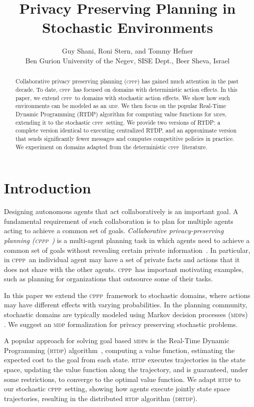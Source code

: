 \documentclass[letterpaper]{article} %
\title{Privacy Preserving Planning in Stochastic Environments}
\author{Guy Shani, Roni Stern, and Tommy Hefner\\
Ben Gurion University of the Negev, SISE Dept., Beer Sheva, Israel}
\newcommand{\cppp}{\textsc {cppp}\xspace}
\newcommand{\rtdp}{\textsc {rtdp}\xspace}
\newcommand{\drtdp}{\textsc {drtdp}\xspace}
\newcommand{\mdps}{\textsc {mdp}s\xspace}
\newcommand{\mdp}{\textsc {mdp}\xspace}
\theoremstyle{remark}
\newcommand{\citep}[1]{\cite{#1}}
\begin{document}
\maketitle

\begin{abstract}

Collaborative privacy preserving planning (\cppp) has gained much attention in the past decade. To date, \cppp\ has focused on domains with deterministic action effects. In this paper, we extend \cppp\ to domains with stochastic action effects. We show how such environments can be modeled as an \mdp. We then focus on the popular Real-Time Dynamic Programming (RTDP) algorithm for computing value functions for \mdps, extending it to the stochastic \cppp\ setting. We provide two versions of RTDP: a complete version identical to executing centralized RTDP, and an approximate version that sends significantly fewer messages and computes competitive policies in practice. We experiment on domains adapted from the deterministic \cppp\ literature.
\end{abstract}



\section{Introduction}

Designing autonomous agents that act collaboratively is an important goal. A fundamental requirement of such collaboration is to plan for multiple agents acting to achieve a common set of goals.  \emph{Collaborative privacy-preserving planning (\cppp\ )} is a multi-agent planning task in which agents need to achieve a common set of goals without revealing certain private information~\citep{brafman2008one}. In particular, in \cppp\  an individual agent may have a set of private facts and actions that it does not share with the other agents. \cppp\  has important motivating examples, such as planning for organizations that outsource some of their tasks.

In this paper we extend the \cppp\ framework to stochastic domains, where actions may have different effects with varying probabilities. In the planning community, stochastic domains are typically modeled using Markov decision processes (\mdps) \cite[e.g.]{kolobov2012planning}. We suggest an \mdp formalization for privacy preserving stochastic problems.

A popular approach for solving goal based \mdps is the Real-Time Dynamic Programming (\rtdp) algorithm~\cite{barto1995learning}, computing a value function, estimating the expected cost to the goal from each state. \rtdp executes trajectories in the state space, updating the value function along the trajectory, and is guaranteed, under some restrictions, to converge to the optimal value function. We adapt \rtdp to our stochastic \cppp\ setting, showing how agents execute jointly state space trajectories, resulting in the distributed \rtdp algorithm (\drtdp).
\end{document}
